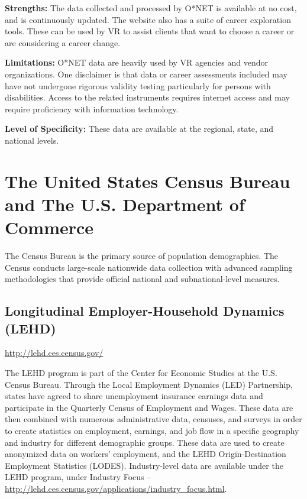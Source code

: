 \documentclass[]{book}
\theoremstyle{definition}
\theoremstyle{definition}
\theoremstyle{definition}
\theoremstyle{remark}
\begin{document}
\textbf{Strengths:} The data collected and processed by O*NET is
available at no cost, and is continuously updated. The website also has
a suite of career exploration tools. These can be used by VR to assist
clients that want to choose a career or are considering a career change.

\textbf{Limitations:} O*NET data are heavily used by VR agencies and
vendor organizations. One disclaimer is that data or career assessments
included may have not undergone rigorous validity testing particularly
for persons with disabilities. Access to the related instruments
requires internet access and may require proficiency with information
technology.

\textbf{Level of Specificity:} These data are available at the regional,
state, and national levels.

\section{The United States Census Bureau and The U.S. Department of
Commerce}\label{the-united-states-census-bureau-and-the-u.s.-department-of-commerce}

The Census Bureau is the primary source of population demographics. The
Census conducts large-scale nationwide data collection with advanced
sampling methodologies that provide official national and
subnational-level measures.

\subsection{Longitudinal Employer-Household Dynamics
(LEHD)}\label{longitudinal-employer-household-dynamics-lehd}

\url{http://lehd.ces.census.gov/}

The LEHD program is part of the Center for Economic Studies at the U.S.
Census Bureau. Through the Local Employment Dynamics (LED) Partnership,
states have agreed to share unemployment insurance earnings data and
participate in the Quarterly Census of Employment and Wages. These data
are then combined with numerous administrative data, censuses, and
surveys in order to create statistics on employment, earnings, and job
flow in a specific geography and industry for different demographic
groups. These data are used to create anonymized data on workers'
employment, and the LEHD Origin-Destination Employment Statistics
(LODES). Industry-level data are available under the LEHD program, under
Industry Focus --
\url{http://lehd.ces.census.gov/applications/industry_focus.html}.
\end{document}
